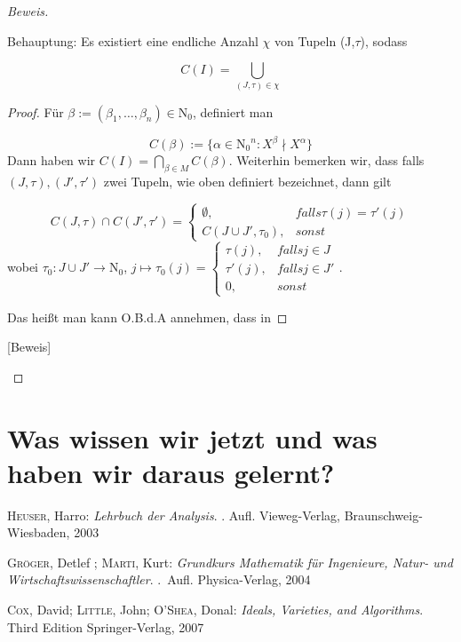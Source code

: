 \documentclass{article}
\newcommand*{\indx}[2]{{#1}_{#2}}
\newcommand*{\potx}[2]{{#1}^{#2}}
\newcommand*{\N}{\mathrm{N}_0}
\begin{document}
\begin{proof}[Beweis]
\begin{itemize}
Behauptung: Es existiert eine endliche Anzahl $\chi$ von Tupeln (J,$\tau$), sodass 

\begin{displaymath}
C(I)=\bigcup\limits_{(J,\tau)\in \chi}
\end{displaymath}

\begin{proof}
	Für $\beta:=(\indx{\beta}{1},\ldots,\indx{\beta}{n}) \in \N$, definiert man 
	
	\begin{displaymath}
	C(\beta):=\{\alpha\in \potx{\N}{n}: \potx{X}{\beta}\nmid\potx{X}{\alpha}\}
	\end{displaymath}
	Dann haben wir $C(I)=\bigcap\limits_{\beta\in M}C(\beta)$. 
	Weiterhin bemerken wir, dass falls $(J,\tau),(J\prime,\tau\prime)$ zwei Tupeln, wie oben definiert bezeichnet, dann gilt 
	
	\begin{displaymath}
	C(J,\tau)\cap C(J\prime,\tau\prime)=\left\{\begin{array}{ll} \emptyset, & falls  \tau(j)=\tau\prime(j) \\
	C(J\cup J\prime, \tau_0), & sonst \end{array}\right.
	\end{displaymath} 
	wobei $\indx{\tau}{0}:J\cup J\prime \longrightarrow \N$, $ j\mapsto \tau_{0}(j)=\left\{\begin{array}{ll} \tau(j), & falls  j\in J \\
	\tau\prime(j), & falls  j\in J\prime \\
	0, & sonst \end{array}\right.$.
	
	Das heißt man kann O.B.d.A annehmen, dass in 
 	
\end{proof}[Beweis]
	\end{itemize}
\end{proof}


\section{Was wissen wir jetzt und was haben wir daraus gelernt?}

\begin{thebibliography}{99}
	\textsc{Heuser}, Harro:
	\newblock \emph{Lehrbuch der Analysis}.
	. Aufl.
	\newblock Vieweg-Verlag, Braunschweig-Wiesbaden, 2003
	
	\textsc{Gr{\"o}ger}, Detlef ; \textsc{Marti}, Kurt:
	\newblock \emph{Grundkurs Mathematik für Ingenieure, Natur- und
		Wirtschaftswissenschaftler}.
	.~Aufl.
	\newblock Physica-Verlag, 2004

	\textsc{Cox}, David; \textsc{Little}, John; \textsc{O'Shea}, Donal:
	\newblock \emph{Ideals, Varieties, and Algorithms}.
	\newblock Third Edition
	\newblock Springer-Verlag, 2007
\end{thebibliography}
\end{document}
